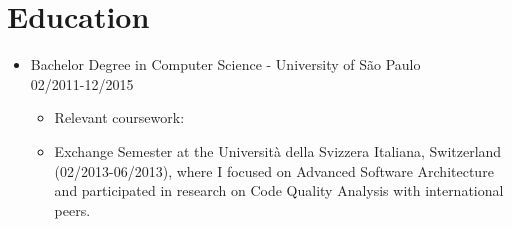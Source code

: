 
\section{Education}
\begin{itemize}
    \item \footnotesize{Bachelor Degree in Computer Science - University of São Paulo}\\
    \scriptsize{02/2011-12/2015}
    \begin{itemize}
        \item \scriptsize{Relevant coursework: \RelevantCoursework}
        \item \scriptsize{Exchange Semester at the Università della Svizzera Italiana, Switzerland
            (02/2013-06/2013), where I focused on Advanced Software Architecture and participated in 
            research on Code Quality Analysis with international peers.}
    \end{itemize}
\end{itemize}